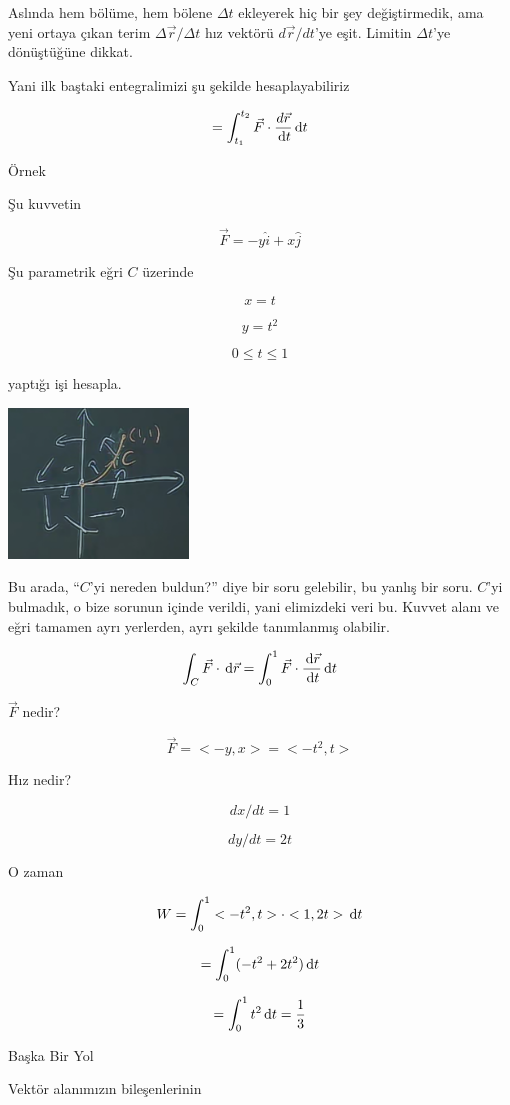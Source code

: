 \documentclass[12pt,fleqn]{article}\usepackage{../../common}
\begin{document}
Aslında hem bölüme, hem bölene $\Delta t$ ekleyerek hiç bir şey
değiştirmedik, ama yeni ortaya çıkan terim $\Delta\vec{r} / \Delta t$ hız
vektörü $d\vec{r}/dt$'ye eşit. Limitin $\Delta t$'ye dönüştüğüne dikkat.

Yani ilk baştaki entegralimizi şu şekilde hesaplayabiliriz

$$ = \int_{t_1}^{t_2} \vec{F} \cdot \frac{d\vec{r}}{\,\mathrm{d} t} \,\mathrm{d} t $$

Örnek

Şu kuvvetin

$$ \vec{F} = -y\hat{i} + x\hat{j} $$

Şu parametrik eğri $C$ üzerinde

$$ x = t  $$

$$ y = t^2 $$

$$ 0 \le t \le 1 $$

yaptığı işi hesapla. 

\includegraphics[height=4cm]{19_10.png}

Bu arada, ``$C$'yi nereden buldun?'' diye bir soru gelebilir, bu yanlış bir
soru. $C$'yi bulmadık, o bize sorunun içinde verildi, yani elimizdeki veri
bu. Kuvvet alanı ve eğri tamamen ayrı yerlerden, ayrı şekilde tanımlanmış
olabilir. 

$$
\int_C \vec{F} \cdot \,\mathrm{d}\vec{r} 
= \int_{0}^{1} \vec{F} \cdot \frac{\,\mathrm{d}\vec{r}}{\,\mathrm{d} t} \,\mathrm{d} t 
$$

$\vec{F}$ nedir? 

$$ \vec{F} = <-y,x> = <-t^2,t> $$

Hız nedir? 

$$ dx/dt = 1 $$

$$ dy/dt = 2t $$

O zaman 

$$ W = \int_{0}^{1}  <-t^2,t>\cdot<1,2t> \,\mathrm{d} t $$

$$ = \int_{0}^{1} (-t^2 + 2t^2) \,\mathrm{d} t $$

$$ = \int_{0}^{1} t^2 \,\mathrm{d} t = \frac{1}{3} $$

Başka Bir Yol

Vektör alanımızın bileşenlerinin
\end{document}
